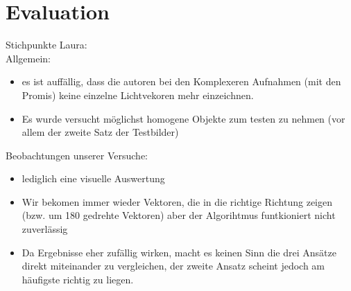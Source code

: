 \section{Evaluation}

Stichpunkte Laura:\\
Allgemein:\\
\begin{itemize}
\item es ist auffällig, dass die autoren bei den Komplexeren Aufnahmen (mit den Promis) keine einzelne Lichtvekoren mehr einzeichnen. 
\item Es wurde versucht möglichst homogene Objekte zum testen zu nehmen (vor allem der zweite Satz der Testbilder)
\end{itemize}

Beobachtungen unserer Versuche:\\
\begin{itemize}
\item lediglich eine visuelle Auswertung
\item Wir bekomen immer wieder Vektoren, die in die richtige Richtung zeigen  (bzw. um 180 gedrehte Vektoren) aber der Algorihtmus funtkioniert nicht zuverlässig
\item Da Ergebnisse eher zufällig wirken, macht es keinen Sinn die drei Ansätze direkt miteinander zu vergleichen, der zweite Ansatz scheint jedoch am häufigste richtig zu liegen.
\end{itemize}





\newpage